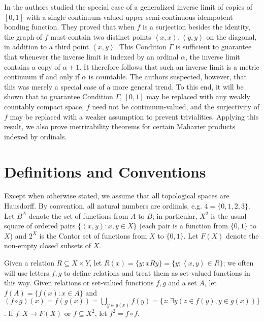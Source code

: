 \documentclass{article}
\newcommand{\tuple}[1]{\left\langle{#1}\right\rangle}
\theoremstyle{plain}
\theoremstyle{definition}
\theoremstyle{remark}
\begin{document}
In \cite{CLONTZVARAGONA} the authors studied the special case of a generalized inverse limit 
of copies of \([0,1]\) with a 
single continuum-valued upper semi-continuous idempotent bonding function. 
They proved that when \(f\) is a surjection besides the identity, 
the graph of \(f\) must contain two distinct points 
\(\tuple{x,x},\tuple{y,y}\) on the diagonal, in addition
to a third point \(\tuple{x,y}\). This Condition \(\Gamma\)
is sufficient to guarantee that whenever
the inverse limit is indexed by an ordinal \(\alpha\),
the inverse limit contains a copy of \(\alpha+1\). It 
therefore follows that such an inverse limit is a metric continuum if and only if 
\(\alpha\) is countable. The authors suspected, however, that this was merely
a special case of a more general trend. To this end, it will be shown
that to guarantee Condition \(\Gamma\), \([0,1]\) may be replaced with any
weakly countably compact space, \(f\) need not be continuum-valued,
and the surjectivity of \(f\) may be replaced with a weaker assumption
to prevent trivialities. Applying this result, we also prove metrizability theorems for certain Mahavier products indexed by ordinals.

\section{Definitions and Conventions}

Except when otherwise stated,
we assume that all topological spaces are Hausdorff. By convention, all natural numbers are ordinals, e.g. \(4=\{0,1,2,3\}\).
Let \(B^A\) denote the set of functions from \(A\) to \(B\);
in particular, \(X^2\) is the usual square of ordered pairs 
\(\{\tuple{x,y}:x,y\in X\}\) (each pair is a function from \(\{0,1\}\) to \(X\))
and \(2^X\) is the Cantor set of functions from \(X\) to \(\{0,1\}\).
Let \(F(X)\) denote the non-empty closed subsets of \(X\).

Given a relation \(R\subseteq X\times Y\), let 
\(R(x)=\{y:xRy\}=\{y:\tuple{x,y}\in R\}\); we often will use letters
\(f,g\) to define relations and treat them as set-valued functions in this way.
Given relations or set-valued functions \(f,g\) and a set \(A\), let
\(f(A)=\{f(x):x\in A\}\) and
\(
  (f\circ g)(x)=f(g(x))=\bigcup_{y\in g(x)}f(y)
=
  \{z:\exists y(z\in f(y),y\in g(x))\}
\).
If \(f:X\to F(X)\) or \(f\subseteq X^2\), let \(f^2=f\circ f\).
\end{document}
